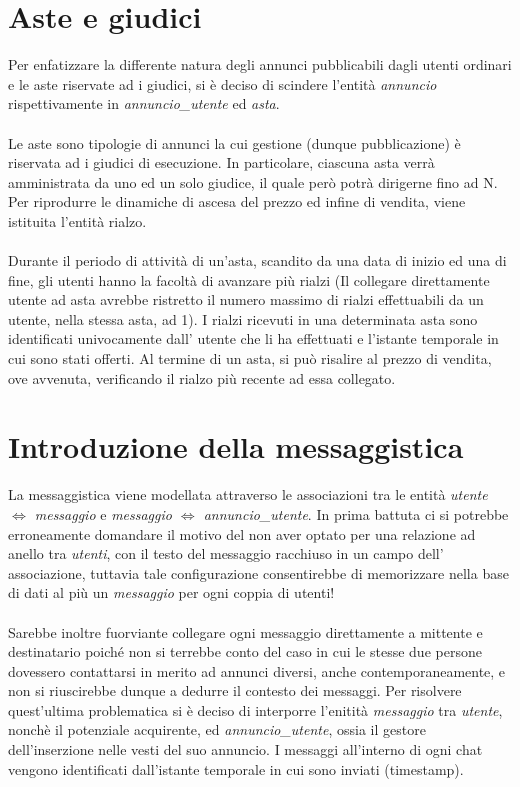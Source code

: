 \documentclass[a4paper,12pt]{report}
\begin{document}
        \section{Aste e giudici}
        Per enfatizzare la differente natura degli annunci pubblicabili dagli utenti ordinari e le aste riservate ad i giudici,
        si è deciso di scindere l'entità \textit{annuncio} rispettivamente in \textit{annuncio\_utente} ed \textit{asta}. \\
        \\
        Le aste sono tipologie di annunci la cui gestione (dunque pubblicazione) è riservata ad i giudici di esecuzione.
        In particolare, ciascuna asta verrà amministrata da uno ed un solo giudice, il quale però potrà dirigerne fino ad N.
        Per riprodurre le dinamiche di ascesa del prezzo ed infine di vendita, viene istituita l’entità rialzo. \\
        \\
        Durante il periodo di attività di un’asta, scandito da una data di inizio ed una di fine, gli utenti hanno la facoltà di avanzare più rialzi 
        (Il collegare direttamente utente ad asta avrebbe ristretto il numero massimo di rialzi effettuabili da un utente, nella stessa asta, ad 1).
        I rialzi ricevuti in una determinata asta sono identificati univocamente dall’ utente che li ha effettuati e l’istante temporale in cui sono 
        stati offerti. Al termine di un asta, si può risalire al prezzo di vendita, ove avvenuta, verificando il rialzo più recente ad essa collegato.
        	
    	\section{Introduzione della messaggistica}
        La messaggistica viene modellata attraverso le associazioni tra le entità \textit{utente $\Leftrightarrow$ messaggio} e 
        \textit{messaggio $\Leftrightarrow$ annuncio\_utente}. In prima battuta ci si potrebbe erroneamente domandare il motivo 
        del non aver optato per una relazione ad anello tra \textit{utenti}, con il testo del messaggio racchiuso in un campo 
        dell’ associazione, tuttavia tale configurazione consentirebbe di memorizzare nella base di dati al più un 
        \textit{messaggio} per ogni coppia di utenti! \\
        \\
        Sarebbe inoltre fuorviante collegare ogni messaggio direttamente 
        a mittente e destinatario poiché non si terrebbe conto del caso in cui le stesse due persone dovessero contattarsi in merito ad annunci 
        diversi, anche contemporaneamente, e non si riuscirebbe dunque a dedurre il contesto dei messaggi. Per risolvere quest’ultima problematica 
        si è deciso di interporre l'enitità \textit{messaggio} tra \textit{utente}, nonchè il potenziale acquirente, ed \textit{annuncio\_utente}, 
        ossia il gestore dell’inserzione nelle vesti del suo annuncio. I messaggi all’interno di ogni chat vengono identificati dall’istante 
        temporale in cui sono inviati (timestamp). \\
        
\end{document}
